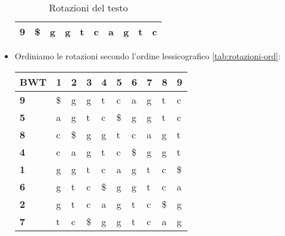 \begin{esempio}
\begin{itemize}
\begin{table}[!ht]
\begin{tabular}{|
                          >{\columncolor[HTML]{EFEFEF}}l |lllllllll|}
                      \textbf{9}                         & \$ & g  & g  & t  & c  & a  & g  & t  & c  \\ \hline
                  \end{tabular}
                  \caption{Rotazioni del testo}
                  \label{tab:rotazioni}
              \end{table}
        \item Ordiniamo le rotazioni secondo l'ordine lessicografico \ref{tab:rotazioni-ord}:
              \begin{table}[!ht]
                  \centering
                  \begin{tabular}{|
                          >{\columncolor[HTML]{EFEFEF}}l |l|l|l|l|l|l|l|l|l|}
                      \hline
                      \textbf{BWT}                       &
                      \cellcolor[HTML]{EFEFEF}\textbf{1} &
                      \cellcolor[HTML]{EFEFEF}\textbf{2} &
                      \cellcolor[HTML]{EFEFEF}\textbf{3} &
                      \cellcolor[HTML]{EFEFEF}\textbf{4} &
                      \cellcolor[HTML]{EFEFEF}\textbf{5} &
                      \cellcolor[HTML]{EFEFEF}\textbf{6} &
                      \cellcolor[HTML]{EFEFEF}\textbf{7} &
                      \cellcolor[HTML]{EFEFEF}\textbf{8} &
                      \cellcolor[HTML]{EFEFEF}\textbf{9}                                              \\ \hline
                      \textbf{9}                         & \$ & g  & g  & t  & c  & a  & g  & t  & c  \\ \hline
                      \textbf{5}                         & a  & g  & t  & c  & \$ & g  & g  & t  & c  \\ \hline
                      \textbf{8}                         & c  & \$ & g  & g  & t  & c  & a  & g  & t  \\ \hline
                      \textbf{4}                         & c  & a  & g  & t  & c  & \$ & g  & g  & t  \\ \hline
                      \textbf{1}                         & g  & g  & t  & c  & a  & g  & t  & c  & \$ \\ \hline
                      \textbf{6}                         & g  & t  & c  & \$ & g  & g  & t  & c  & a  \\ \hline
                      \textbf{2}                         & g  & t  & c  & a  & g  & t  & c  & \$ & g  \\ \hline
                      \textbf{7}                         & t  & c  & \$ & g  & g  & t  & c  & a  & g  \\ \hline

\end{tabular}
\end{table}
\end{itemize}
\end{esempio}

